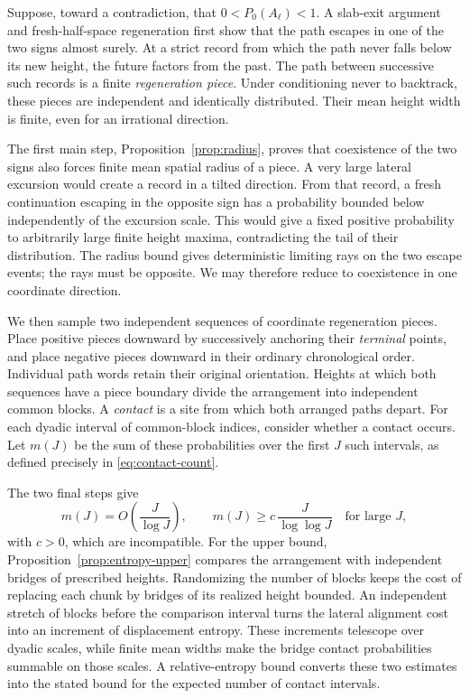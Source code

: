 Suppose, toward a contradiction, that $0<P_0(A_\ell)<1$.
A slab-exit argument and fresh-half-space regeneration first show that
the path escapes in one of the two signs almost surely.
At a strict record from which the path
never falls below its new height, the future factors from the past.
The path between successive such records is a finite \emph{regeneration
piece}. Under conditioning never to backtrack, these pieces are
independent and identically distributed. Their mean height width is
finite, even for an irrational direction.

The first main step, Proposition~\ref{prop:radius}, proves that
coexistence of the two signs also forces finite mean spatial radius of
a piece. A very large lateral
excursion would create a record in a tilted direction. From that record,
a fresh continuation escaping in the opposite sign has a probability
bounded below independently of the excursion scale. This would give a
fixed positive probability to arbitrarily large finite height maxima,
contradicting the tail of their distribution.
The radius bound gives deterministic limiting rays on the two escape
events; the rays must be opposite. We may therefore reduce to
coexistence in one coordinate direction.

We then sample two independent sequences of coordinate regeneration
pieces. Place positive pieces downward by successively anchoring their
\emph{terminal} points, and place negative pieces downward in their
ordinary chronological order. Individual path words retain their
original orientation. Heights at which both sequences have a piece
boundary divide the arrangement into independent common blocks.
A \emph{contact} is a site from which both arranged paths depart.
For each dyadic interval of common-block indices, consider whether a
contact occurs. Let $m(J)$ be the sum of these probabilities over the
first $J$ such intervals, as defined precisely in
\eqref{eq:contact-count}.

The two final steps give
\[
 m(J)=O\!\left(\frac{J}{\log J}\right),\qquad
 m(J)\ge c\,\frac{J}{\log\log J}\quad\text{for large }J,
\]
with $c>0$, which are incompatible.
For the upper bound, Proposition~\ref{prop:entropy-upper} compares the
arrangement with independent bridges of prescribed heights. Randomizing
the number of blocks keeps the cost of replacing each chunk by bridges
of its realized height bounded.
An independent stretch of blocks before the comparison interval turns the
lateral alignment cost into an increment of displacement entropy. These
increments telescope over dyadic scales, while finite mean widths make
the bridge contact probabilities summable on those scales. A
relative-entropy bound converts these two estimates into the stated bound
for the expected number of contact intervals.

